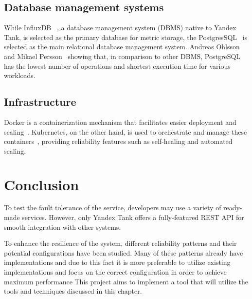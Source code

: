 \subsection{Database management systems}
While InfluxDB~\cite{influxdb} , a database management system (DBMS) native to Yandex Tank, is selected as the primary database for metric storage, the PostgresSQL~\cite{postgresql} is selected as the main relational database management system. Andreas Ohlsson and Mikael Persson~\cite{dbs_comparison} showing that, in comparison to other DBMS, PostgreSQL has the lowest number of operations and shortest execution time for various workloads.

\subsection{Infrastructure}
Docker is a containerization mechanism that facilitates easier deployment and scaling~\cite{docker_start}.
Kubernetes, on the other hand, is used to orchestrate and manage these containers~\cite{kubernetes}, providing reliability features such as self-healing and automated scaling.

\section{Conclusion}\label{sec:review_conclusion}
To test the fault tolerance of the service, developers may use a variety of ready-made services. However, only Yandex Tank offers a fully-featured REST API for smooth integration with other systems.

To enhance the resilience of the system, different reliability patterns and their potential configurations have been studied. Many of these patterns already have implementations and due to this fact it is more preferable to utilize existing implementations and focus on the correct configuration in order to achieve maximum performance
This project aims to implement a tool that will utilize the tools and techniques discussed in this chapter.